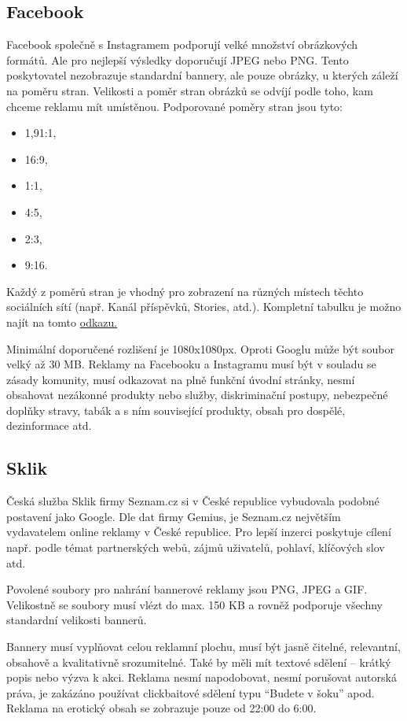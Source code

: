    \subsection{Facebook}
    Facebook společně s Instagramem podporují velké množství obrázkových formátů. Ale pro nejlepší výsledky doporučují JPEG nebo PNG.
    Tento poskytovatel nezobrazuje standardní bannery, ale pouze obrázky, u kterých záleží na poměru stran.
    Velikosti a poměr stran obrázků se odvíjí podle toho, kam chceme reklamu mít umístěnou. Podporované poměry stran jsou tyto:
    \begin{itemize}
        \item 1,91:1,
        \item 16:9,
        \item 1:1,
        \item 4:5,
        \item 2:3,
        \item 9:16.
    \end{itemize}

    Každý z poměrů stran je vhodný pro zobrazení na různých místech těchto sociálních sítí (např. Kanál příspěvků, Stories, atd.).
    Kompletní tabulku je možno najít na tomto \href{https://www.facebook.com/business/help/682655495435254?id=271710926837064}{odkazu.}

    Minimální doporučené rozlišení je 1080x1080px. Oproti Googlu může být soubor velký až 30 MB.
    Reklamy na Facebooku a Instagramu musí být v souladu se zásady komunity, musí odkazovat na plně funkční úvodní stránky,
    nesmí obsahovat nezákonné produkty nebo služby, diskriminační postupy, nebezpečné doplňky stravy, tabák a s ním související produkty,
    obsah pro dospělé, dezinformace atd.

    \subsection{Sklik}
    Česká služba Sklik firmy Seznam.cz si v České republice vybudovala podobné postavení jako Google.
    Dle dat firmy Gemius, je Seznam.cz největším vydavatelem online reklamy v České republice. Pro lepší inzerci poskytuje cílení
    např. podle témat partnerských webů, zájmů uživatelů, pohlaví, klíčových slov atd.

    Povolené soubory pro nahrání bannerové reklamy jsou PNG, JPEG a GIF. Velikostně se soubory musí vlézt do max. 150 KB a
    rovněž podporuje všechny standardní velikosti bannerů.

    Bannery musí vyplňovat celou reklamní plochu, musí být jasně čitelné, relevantní, obsahově a kvalitativně srozumitelné.
    Také by měli mít textové sdělení -- krátký popis nebo výzva k akci. Reklama nesmí napodobovat, nesmí porušovat autorská práva,
    je zakázáno používat clickbaitové sdělení typu \enquote{Budete v šoku} apod. Reklama na erotický obsah se zobrazuje pouze od 22:00 do 6:00.  

\endinput